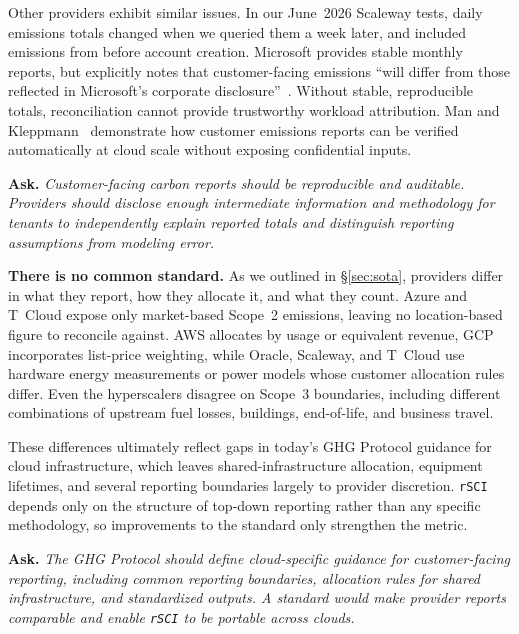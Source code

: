 \documentclass[sigconf,screen,nonacm]{acmart}
\newcommand{\parag}[1]{\vspace{2mm}\noindent\textbf{#1.}\hspace{2mm}}
\newcommand{\RSCI}{\texttt{rSCI}\xspace}
\newenvironment{callforaction}
  {\par\medskip\noindent\begin{lrbox}{\cfabox}%
   \begin{minipage}{\dimexpr\columnwidth-2\fboxsep-2\fboxrule\relax}%
   \small\textbf{Ask.}\hspace{1mm}\itshape}
  {\end{minipage}\end{lrbox}\noindent\fbox{\usebox{\cfabox}}\par\medskip}
\begin{document}
Other providers exhibit similar issues.
In our June~2026 Scaleway tests, daily emissions totals changed when we queried them a week later, and included emissions from before account creation.
Microsoft provides stable monthly reports, but explicitly notes that customer-facing emissions ``will differ from those reflected in Microsoft's corporate disclosure''~\cite{microsoft-s3-2021}.
Without stable, reproducible totals, reconciliation cannot provide trustworthy workload attribution.
Man and Kleppmann~\cite{man2026emissionimpossible} demonstrate how customer emissions reports can be verified automatically at cloud scale without exposing confidential inputs.

\begin{callforaction}
Customer-facing carbon reports should be reproducible and auditable.
Providers should disclose enough intermediate information and methodology for tenants to independently explain reported totals and distinguish reporting assumptions from modeling error.
\end{callforaction}

\parag{There is no common standard}
As we outlined in \S\ref{sec:sota}, providers differ in what they report, how they allocate it, and what they count.
Azure and T~Cloud expose only market-based Scope~2 emissions, leaving no location-based figure to reconcile against.
AWS allocates by usage or equivalent revenue, GCP incorporates list-price weighting, while Oracle, Scaleway, and T~Cloud use hardware energy measurements or power models whose customer allocation rules differ.
Even the hyperscalers disagree on Scope~3 boundaries, including different combinations of upstream fuel losses, buildings, end-of-life, and business travel.

These differences ultimately reflect gaps in today's GHG Protocol guidance for cloud infrastructure, which leaves shared-infrastructure allocation, equipment lifetimes, and several reporting boundaries largely to provider discretion.
\RSCI depends only on the structure of top-down reporting rather than any specific methodology, so improvements to the standard only strengthen the metric.

\begin{callforaction}
The GHG Protocol should define cloud-specific guidance for customer-facing reporting, including common reporting boundaries, allocation rules for shared infrastructure, and standardized outputs.
A standard would make provider reports comparable and enable \RSCI to be portable across clouds.
\end{callforaction}
\end{document}
